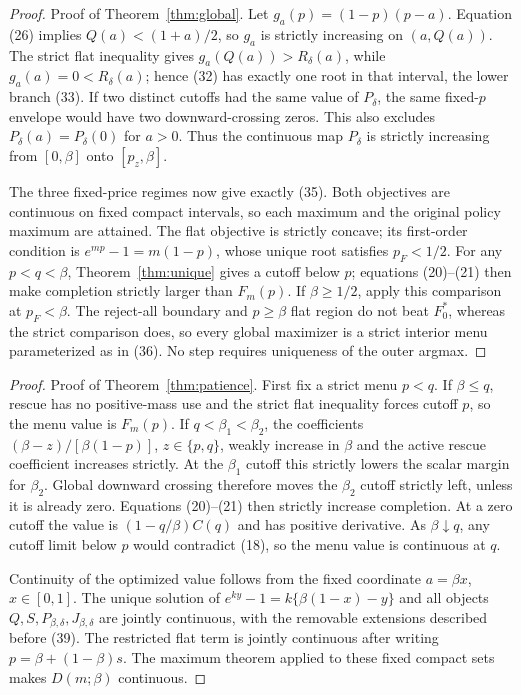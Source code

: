 \documentclass[mnsc,dblanonrev]{informs4}
\begin{document}
\begin{APPENDICES}
\begin{proof}{Proof of Theorem~\ref{thm:global}.}
Let $g_a(p)=(1-p)(p-a)$.  Equation (26) implies
$Q(a)<(1+a)/2$, so $g_a$ is strictly increasing on $(a,Q(a))$.  The strict
flat inequality gives $g_a(Q(a))>R_\delta(a)$, while
$g_a(a)=0<R_\delta(a)$; hence (32)
has exactly one root in that interval, the lower branch (33).  If two
distinct cutoffs had the same value of $P_\delta$, the same fixed-$p$
envelope would have two downward-crossing zeros.  This also excludes
$P_\delta(a)=P_\delta(0)$ for $a>0$.  Thus the continuous map $P_\delta$ is strictly increasing from
$[0,\beta]$ onto $[p_z,\beta]$.

The three fixed-price regimes now give exactly (35).  Both objectives are
continuous on fixed compact intervals, so each maximum and the original
policy maximum are attained.  The flat objective is strictly concave; its
first-order condition is $e^{mp}-1=m(1-p)$, whose unique root satisfies
$p_F<1/2$.  For any $p<q<\beta$, Theorem~\ref{thm:unique} gives a cutoff
below $p$; equations (20)--(21) then make completion strictly larger than
$F_m(p)$.  If $\beta\ge1/2$, apply this comparison at $p_F<\beta$.
The reject-all boundary and $p\ge\beta$ flat region do not beat $F_0^*$,
whereas the strict comparison does, so every global maximizer is a strict
interior menu parameterized as in (36).  No step requires uniqueness of the
outer argmax.
\Halmos\end{proof}

\begin{proof}{Proof of Theorem~\ref{thm:patience}.}
First fix a strict menu $p<q$.  If $\beta\le q$, rescue has no positive-mass
use and the strict flat inequality forces cutoff $p$, so the menu value is
$F_m(p)$.  If $q<\beta_1<\beta_2$, the coefficients
$(\beta-z)/[\beta(1-p)]$, $z\in\{p,q\}$, weakly increase in $\beta$ and the
active rescue coefficient increases strictly.  At the $\beta_1$ cutoff this
strictly lowers the scalar margin for $\beta_2$.  Global downward crossing
therefore moves the $\beta_2$ cutoff strictly left, unless it is already zero.
Equations (20)--(21) then strictly increase completion.  At a zero cutoff the
value is $(1-q/\beta)C(q)$ and has positive derivative.  As
$\beta\downarrow q$, any cutoff limit below $p$ would contradict (18), so
the menu value is continuous at $q$.

Continuity of the optimized value follows from the fixed coordinate
$a=\beta x$, $x\in[0,1]$.  The unique solution of
$e^{ky}-1=k\{\beta(1-x)-y\}$ and all objects
$Q,S,P_{\beta,\delta},J_{\beta,\delta}$ are jointly
continuous, with the removable extensions described before (39).  The
restricted flat term is jointly continuous after writing
$p=\beta+(1-\beta)s$.  The maximum theorem applied to these fixed compact
sets makes $D(m;\beta)$ continuous.


\end{proof}
\end{APPENDICES}
\end{document}
